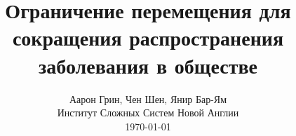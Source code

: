 \documentclass[onecolumn,journal]{IEEEtran}
\begin{document}
\title{\color{Brown} Ограничение перемещения для \\ сокращения распространения заболевания в обществе \\
\vspace{-0.35ex}}
\author{Аарон Грин, Чен Шен, Янир Бар-Ям \\ Институт Сложных Систем Новой Англии \\
 \today 
  \vspace{-14ex} \\ 

   
\bigskip
\bigskip

\textbf{}
 }
    
\maketitle


\flushbottom %



\thispagestyle{empty} %




\renewcommand{\thefootnote}{\fnsymbol{footnote}}
\end{document}
